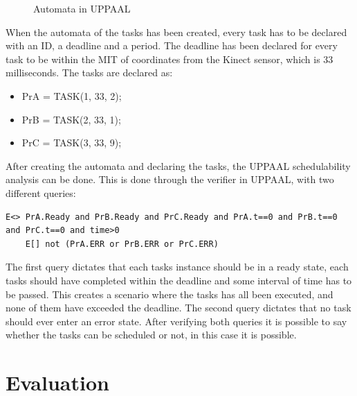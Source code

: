 \begin{figure}[h]
	\centering
	\caption{Automata in UPPAAL}
	\label{robot}
\end{figure}

When the automata of the tasks has been created, every task has to be declared with an ID, a deadline and a period. The deadline has been declared for every task to be within the MIT of coordinates from the Kinect sensor, which is 33 milliseconds.
The tasks are declared as:

\begin{itemize}
	\item PrA = TASK(1, 33, 2);
	\item PrB = TASK(2, 33, 1);
	\item PrC = TASK(3, 33, 9);
\end{itemize}

After creating the automata and declaring the tasks, the UPPAAL schedulability analysis can be done. This is done through the verifier in UPPAAL, with two different queries:

\begin{lstlisting}[caption={Queries for UPPAAL}, label={Queries}]
	E<> PrA.Ready and PrB.Ready and PrC.Ready and PrA.t==0 and PrB.t==0 and PrC.t==0 and time>0
	E[] not (PrA.ERR or PrB.ERR or PrC.ERR)
\end{lstlisting}

The first query dictates that each tasks instance should be in a ready state, each tasks should have completed within the deadline and some interval of time has to be passed. This creates a scenario where the tasks has all been executed, and none of them have exceeded the deadline.
The second query dictates that no task should ever enter an error state.
After verifying both queries it is possible to say whether the tasks can be scheduled or not, in this case it is possible.

\section{Evaluation}
\label{sec:i3Evaluation}

